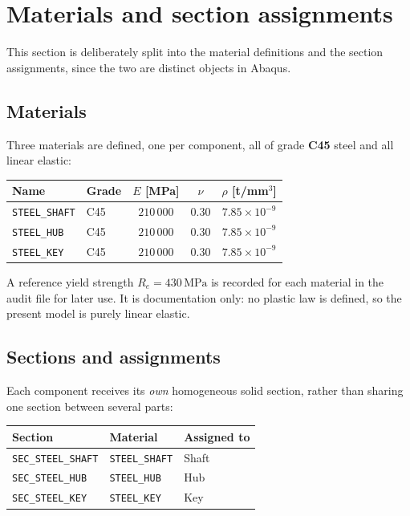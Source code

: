 \documentclass[11pt,a4paper]{article}
\newcommand{\id}[1]{\texttt{#1}}
\newcommand{\unit}[1]{\,\mathrm{#1}}
\begin{document}
\section{Materials and section assignments}
\label{sec:mat}
This section is deliberately split into the material definitions and the section
assignments, since the two are distinct objects in Abaqus.

\subsection{Materials}
Three materials are defined, one per component, all of grade \textbf{C45} steel
and all linear elastic:

\begin{center}
\begin{tabular}{llccc}
\toprule
Name & Grade & $E$ [MPa] & $\nu$ & $\rho$ [t/mm$^3$] \\
\midrule
\id{STEEL\_SHAFT} & C45 & $210\,000$ & $0.30$ & $7.85\times10^{-9}$ \\
\id{STEEL\_HUB}   & C45 & $210\,000$ & $0.30$ & $7.85\times10^{-9}$ \\
\id{STEEL\_KEY}   & C45 & $210\,000$ & $0.30$ & $7.85\times10^{-9}$ \\
\bottomrule
\end{tabular}
\end{center}

\noindent
A reference yield strength $R_e = 430\unit{MPa}$ is recorded for each material in
the audit file for later use. It is documentation only: no plastic law is
defined, so the present model is purely linear elastic.

\subsection{Sections and assignments}
Each component receives its \emph{own} homogeneous solid section, rather than
sharing one section between several parts:

\begin{center}
\begin{tabular}{lll}
\toprule
Section & Material & Assigned to \\
\midrule
\id{SEC\_STEEL\_SHAFT} & \id{STEEL\_SHAFT} & Shaft \\
\id{SEC\_STEEL\_HUB}   & \id{STEEL\_HUB}   & Hub \\
\id{SEC\_STEEL\_KEY}   & \id{STEEL\_KEY}   & Key \\
\bottomrule
\end{tabular}
\end{center}
\end{document}
